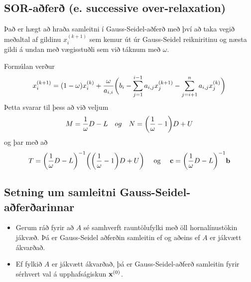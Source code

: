 \documentclass[letterpaper,10pt,icelandic]{sphinxmanual}
\begin{document}
\subsection{SOR-aðferð (e. successive over-relaxation)}
\label{kafli08:sor-afer-e-successive-over-relaxation}\label{kafli08:index-24}
Það er hægt að hraða samleitni í Gauss-Seidel-aðferð með því að taka
vegið meðaltal af gildinu \(x_i^{(k+1)}\) sem kemur út úr
Gauss-Seidel reikniritinu og næsta gildi á undan með vægisstuðli sem við
táknum með \(\omega\).

Formúlan verður
\begin{gather}
\begin{split}x_i^{(k+1)}=(1-\omega)x_i^{(k)}+\dfrac \omega{a_{i,i}}\bigg(
b_i-\sum_{j=1}^{i-1}a_{i,j}x_j^{(k+1)}-\sum_{j=i+1}^n a_{i,j}x_j^{(k)}\bigg)\end{split}\notag
\end{gather}
Þetta svarar til þess að við veljum
\begin{gather}
\begin{split}M=\dfrac 1\omega D-L \quad { og } \quad
N=\bigg(\dfrac 1\omega -1\bigg) D+U\end{split}\notag
\end{gather}
og þar með að
\begin{gather}
\begin{split}T=\bigg(\dfrac 1\omega D-L\bigg)^{-1}
\bigg(\bigg(\dfrac 1\omega-1\bigg)D+ U\bigg)
\quad \text{ og } \quad \mbox{${\bf c}$}=\bigg(\dfrac 1\omega D-L\bigg)^{-1} \mbox{${\bf b}$}\end{split}\notag
\end{gather}

\subsection{Setning um samleitni Gauss-Seidel-aðferðarinnar}
\label{kafli08:setning-um-samleitni-gauss-seidel-aferarinnar}\begin{itemize}
\item {} 
Gerum ráð fyrir að \(A\) sé samhverft rauntölufylki með öll
hornalínustökin jákvæð. Þá er Gauss-Seidel aðferðin samleitin ef og
aðeins ef \(A\) er jákvætt ákvarðað.

\item {} 
Ef fylkið \(A\) er jákvætt ákvarðað, þá er Gauss-Seidel-aðferð
samleitin fyrir sérhvert val á upphafságiskun
\(\mbox{${\bf x}$}^{(0)}\).

\end{itemize}
\end{document}
